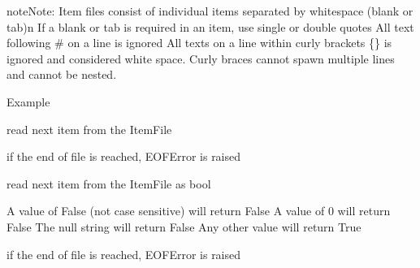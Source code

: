 \documentclass[letterpaper,10pt,english]{sphinxmanual}
\begin{document}
\begin{fulllineitems}
\begin{sphinxadmonition}{note}{Note:}
Item files consist of individual items separated by whitespace (blank or tab)\textbar{}n\textbar{}
If a blank or tab is required in an item, use single or double quotes 
All text following \# on a line is ignored 
All texts on a line within curly brackets \{\} is ignored and considered white space. 
Curly braces cannot spawn multiple lines and cannot be nested.

Example

%
\begin{sphinxVerbatim}[commandchars=\\\{\}]
      
   
\end{sphinxVerbatim}
\end{sphinxadmonition}

\begin{fulllineitems}
\label{\detokenize{Reference:salabim.ItemFile.read_item}}
read next item from the ItemFile

if the end of file is reached, EOFError is raised

\end{fulllineitems}


\begin{fulllineitems}
\label{\detokenize{Reference:salabim.ItemFile.read_item_bool}}
read next item from the ItemFile as bool

A value of False (not case sensitive) will return False 
A value of 0 will return False 
The null string will return False 
Any other value will return True

if the end of file is reached, EOFError is raised

\end{fulllineitems}



\end{fulllineitems}
\end{document}
